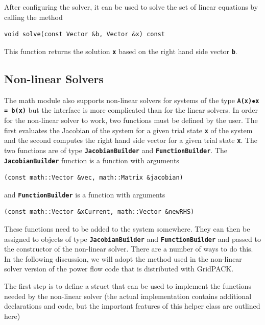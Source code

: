 \documentclass[12pt]{report} %
\begin{document}
After configuring the solver, it can be used to solve the set of linear equations by calling the method

{
\color{red}
\begin{Verbatim}[fontseries=b]
void solve(const Vector &b, Vector &x) const
\end{Verbatim}
}

This function returns the solution \texttt{\textbf{x}} based on the right hand side vector \texttt{\textbf{b}}.

\subsection{Non-linear Solvers}

The math module also supports non-linear solvers for systems of the type \texttt{\textbf{A(x)$\boldsymbol{\mathrm{\bullet}}$x = b(x)}} but the interface is more complicated than for the linear solvers. In order for the non-linear solver to work, two functions must be defined by the user. The first evaluates the Jacobian of the system for a given trial state \texttt{\textbf{x}} of the system and the second computes the right hand side vector for a given trial state \texttt{\textbf{x}}. The two functions are of type \texttt{\textbf{JacobianBuilder}} and \texttt{\textbf{FunctionBuilder}}. The \texttt{\textbf{JacobianBuilder}} function is a function with arguments

{
\color{red}
\begin{Verbatim}[fontseries=b]
    (const math::Vector &vec, math::Matrix &jacobian)
\end{Verbatim}
}

and \texttt{\textbf{FunctionBuilder}} is a function with arguments

{
\color{red}
\begin{Verbatim}[fontseries=b]
    (const math::Vector &xCurrent, math::Vector &newRHS)
\end{Verbatim}
}

These functions need to be added to the system somewhere. They can then be assigned to objects of type \texttt{\textbf{JacobianBuilder}} and \texttt{\textbf{FunctionBuilder}} and passed to the constructor of the non-linear solver. There are a number of ways to do this. In the following discussion, we will adopt the method used in the non-linear solver version of the power flow code that is distributed with GridPACK.

The first step is to define a struct that can be used to implement the functions needed by the non-linear solver (the actual implementation contains additional declarations and code, but the important features of this helper class are outlined here)
\end{document}
